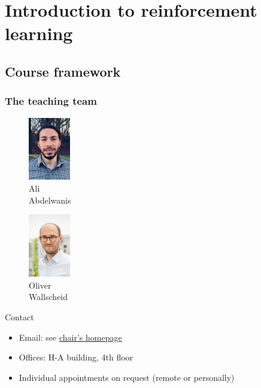 \section{Introduction to reinforcement learning} 

\subsection{Course framework} 

\begin{frame}
	\frametitle{The teaching team}
	\centering
	\begin{minipage}[t]{0.27\linewidth}
		\centering
		\begin{figure}
			\includegraphics[height=2.75cm]{fig/lec01/Abdelwanis.jpg}
			\caption*{Ali \\Abdelwanis}
		\end{figure}
	\end{minipage}
	\hspace{1cm}
	\begin{minipage}[t]{0.27\linewidth}
		\centering
		\begin{figure}
			\includegraphics[height=2.75cm]{fig/lec01/Wallscheid.jpg}
			\caption*{Oliver\\ Wallscheid}
		\end{figure}
	\end{minipage}
	\vspace{-0.25cm}
	\begin{varblock}{Contact}
		\begin{itemize}
			\item Email: see \href{https://www.eti.uni-siegen.de/ias/}{chair's homepage}
			\item Offices: H-A building, 4th floor
			\item Individual appointments on request (remote or personally)
		\end{itemize}
	\end{varblock}
	\end{frame}

